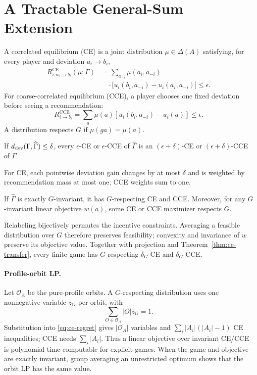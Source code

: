 \section{A Tractable General-Sum Extension}

A correlated equilibrium (CE) is a joint distribution $\mu\in\Delta(A)$ satisfying, for every player and deviation $a_i\to b_i$,
\begin{align}
R^{\mathrm{CE}}_{i,a_i\to b_i}(\mu;\Gamma)
&=
\sum_{a_{-i}}\mu(a_i,a_{-i})\nonumber\\
&\quad\cdot
\bigl[u_i(b_i,a_{-i})-u_i(a_i,a_{-i})\bigr]
\le\epsilon.
\label{eq:ce-regret}
\end{align}
For coarse-correlated equilibrium (CCE), a player chooses one fixed deviation before seeing a recommendation:
\[
R^{\mathrm{CCE}}_{i\to b_i}
=
\sum_a\mu(a)
[u_i(b_i,a_{-i})-u_i(a)]
\le\epsilon.
\]
A distribution respects $G$ if $\mu(ga)=\mu(a)$.

\begin{theorem}
\label{thm:ce-transfer}
If $d_{\mathrm{dev}}(\Gamma,\widehat\Gamma)\le\delta$, every $\epsilon$-CE or $\epsilon$-CCE of $\widehat\Gamma$ is an $(\epsilon+\delta)$-CE or $(\epsilon+\delta)$-CCE of $\Gamma$.
\end{theorem}
For CE, each pointwise deviation gain changes by at most $\delta$ and is weighted by recommendation mass at most one; CCE weights sum to one.

\begin{theorem}
\label{thm:invariant-ce}
If $\widehat\Gamma$ is exactly $G$-invariant, it has $G$-respecting CE and CCE.  Moreover, for any $G$-invariant linear objective $w(a)$, some CE or CCE maximizer respects $G$.
\end{theorem}
Relabeling bijectively permutes the incentive constraints.  Averaging a feasible distribution over $G$ therefore preserves feasibility; convexity and invariance of $w$ preserve its objective value.  Together with projection and Theorem~\ref{thm:ce-transfer}, every finite game has $G$-respecting $\delta_G$-CE and $\delta_G$-CCE.

\paragraph{Profile-orbit LP.}
Let $\mathcal O_A$ be the pure-profile orbits.  A $G$-respecting distribution uses one nonnegative variable $z_O$ per orbit, with
\begin{equation}
\sum_{O\in\mathcal O_A}|O|z_O=1.
\label{eq:orbit-simplex}
\end{equation}
Substitution into \eqref{eq:ce-regret} gives $|\mathcal O_A|$ variables and $\sum_i|A_i|(|A_i|-1)$ CE inequalities; CCE needs $\sum_i|A_i|$.  Thus a linear objective over invariant CE/CCE is polynomial-time computable for explicit games.  When the game and objective are exactly invariant, group averaging an unrestricted optimum shows that the orbit LP has the same value.

